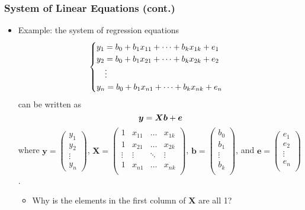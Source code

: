 \documentclass[pdflatex, 12pt]{beamer}
\begin{document}
\begin{frame}
\frametitle{System of Linear Equations (cont.)}
\begin{itemize}
\item Example: the system of regression equations
 {\footnotesize
 \begin{eqnarray}
 \begin{cases}
 y_1 = b_0 + b_1 x_{11} + \cdots + b_k x_{1k} + e_1 & \\
 y_2 = b_0 + b_1 x_{21} + \cdots + b_k x_{2k} + e_2 & \\
 \ \ \ \vdots & \\
 y_n = b_0 + b_1 x_{n1} + \cdots + b_k x_{nk} + e_n & \notag
 \end{cases}
 \end{eqnarray}
 }
can be written as 
 \begin{equation}
 \bm{y} = \bm{Xb} + \bm{e} \notag
 \end{equation}
where {\scriptsize $\bm{y} = \begin{pmatrix}
y_1 \\
y_2 \\
\vdots \\
y_n
\end{pmatrix}$}, {\scriptsize $\bm{X} =
\begin{pmatrix}
 1 & x_{11} & \ldots & x_{1k} \\
 1 & x_{21} &  \ldots & x_{2k} \\
 \vdots & \vdots & \ddots & \vdots \\
 1 & x_{n1} &  \ldots & x_{nk} \\
\end{pmatrix}$}, {\scriptsize $\bm{b} = \begin{pmatrix}
b_0 \\
b_1 \\
\vdots \\
b_k \\
\end{pmatrix}$}, and  {\scriptsize $\bm{e} = \begin{pmatrix}
e_1 \\
e_2 \\
\vdots \\
e_n \\
\end{pmatrix}$}.
 \vspace{0.2cm}
 \begin{itemize}
 \item Why is the elements in the first column of $\bm{X}$ are all 1? 
 \end{itemize}
\end{itemize}
\end{frame}
\end{document}
